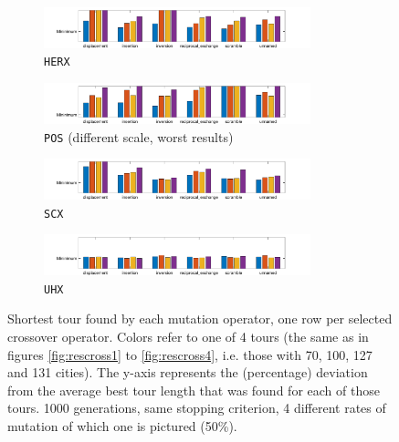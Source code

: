\begin{figure}[H]
	\centering
%
	\begin{subfigure}[b]{\textwidth}
		\centering
		\includegraphics[width=0.85\textwidth]{mutation/min/xedge_heuristic.png}
		\caption{\texttt{HERX}}
		\label{fig:z}
    	\end{subfigure}
	\begin{subfigure}[b]{\textwidth}
		\centering
		\includegraphics[width=0.85\textwidth]{mutation/min/xposition_based.png}
		\caption{\texttt{POS} (different scale, worst results)}
		\label{fig:z}
    	\end{subfigure}
	\begin{subfigure}[b]{\textwidth}
		\centering
		\includegraphics[width=0.85\textwidth]{mutation/min/xseq_constructive.png}
		\caption{\texttt{SCX}}
		\label{fig:z}
    	\end{subfigure}
	\begin{subfigure}[b]{\textwidth}
		\centering
		\includegraphics[width=0.85\textwidth]{mutation/min/xunnamed.png}
		\caption{\texttt{UHX}}
		\label{fig:z}
    	\end{subfigure}
	\caption{Shortest tour found by each mutation operator, one row per selected crossover operator. Colors refer to one of 4 tours (the same as in figures \ref{fig:rescross1} to \ref{fig:rescross4}, i.e. those with 70, 100, 127 and 131 cities). The y-axis represents the (percentage) deviation from the average best tour length that was found for each of those tours. 1000 generations, same stopping criterion, 4 different rates of mutation of which one is pictured (50\%).}
	\label{fig:resmut1}
\end{figure}

